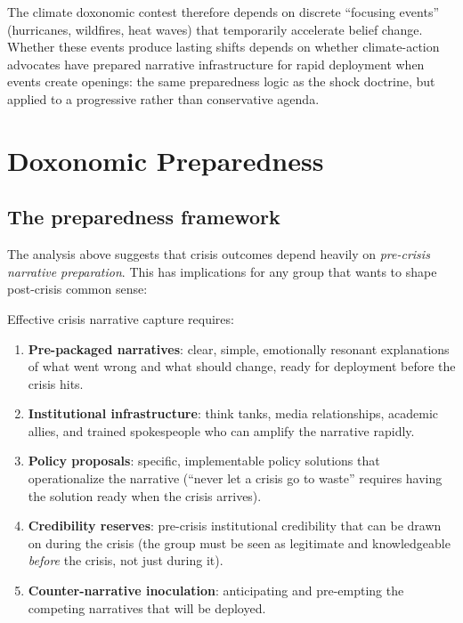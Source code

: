 The climate doxonomic contest therefore depends on discrete ``focusing events'' (hurricanes, wildfires, heat waves) that temporarily accelerate belief change.
Whether these events produce lasting shifts depends on whether climate-action advocates have prepared narrative infrastructure for rapid deployment when events create openings: the same preparedness logic as the shock doctrine, but applied to a progressive rather than conservative agenda.

\section{Doxonomic Preparedness}
\label{sec:ch29-preparedness}

\subsection{The preparedness framework}

The analysis above suggests that crisis outcomes depend heavily on \emph{pre-crisis narrative preparation}.
This has implications for any group that wants to shape post-crisis common sense:

\begin{model}
\label{mod:preparedness}
Effective crisis narrative capture requires:
\begin{enumerate}[nosep]
  \item \textbf{Pre-packaged narratives}: clear, simple, emotionally resonant explanations of what went wrong and what should change, ready for deployment before the crisis hits.
  \item \textbf{Institutional infrastructure}: think tanks, media relationships, academic allies, and trained spokespeople who can amplify the narrative rapidly.
  \item \textbf{Policy proposals}: specific, implementable policy solutions that operationalize the narrative (``never let a crisis go to waste'' requires having the solution ready when the crisis arrives).
  \item \textbf{Credibility reserves}: pre-crisis institutional credibility that can be drawn on during the crisis (the group must be seen as legitimate and knowledgeable \emph{before} the crisis, not just during it).
  \item \textbf{Counter-narrative inoculation}: anticipating and pre-empting the competing narratives that will be deployed.
\end{enumerate}
\end{model}

